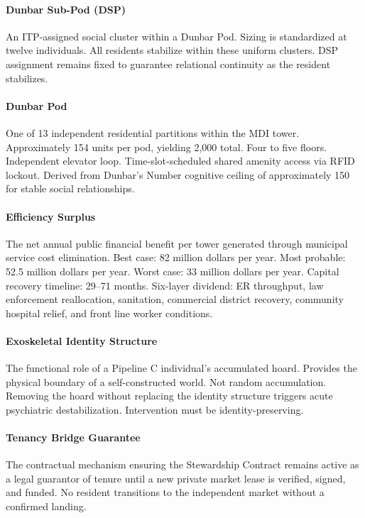 {\paragraph{Dunbar Sub-Pod (DSP)} An ITP-assigned social cluster within a Dunbar Pod. Sizing is standardized at twelve individuals. All residents stabilize within these uniform clusters. DSP assignment remains fixed to guarantee relational continuity as the resident stabilizes.

\paragraph{Dunbar Pod} One of 13 independent residential partitions within the MDI tower. Approximately 154 units per pod, yielding 2,000 total. Four to five floors. Independent elevator loop. Time-slot-scheduled shared amenity access via RFID lockout. Derived from Dunbar's Number cognitive ceiling of approximately 150 for stable social relationships.

\paragraph{Efficiency Surplus} The net annual public financial benefit per tower generated through municipal service cost elimination. Best case: 82 million dollars per year. Most probable: 52.5 million dollars per year. Worst case: 33 million dollars per year. Capital recovery timeline: 29--71 months. Six-layer dividend: ER throughput, law enforcement reallocation, sanitation, commercial district recovery, community hospital relief, and front line worker conditions.

\paragraph{Exoskeletal Identity Structure} The functional role of a Pipeline C individual's accumulated hoard. Provides the physical boundary of a self-constructed world. Not random accumulation. Removing the hoard without replacing the identity structure triggers acute psychiatric destabilization. Intervention must be identity-preserving.

\paragraph{Tenancy Bridge Guarantee} The contractual mechanism ensuring the Stewardship Contract remains active as a legal guarantor of tenure until a new private market lease is verified, signed, and funded. No resident transitions to the independent market without a confirmed landing.

}
